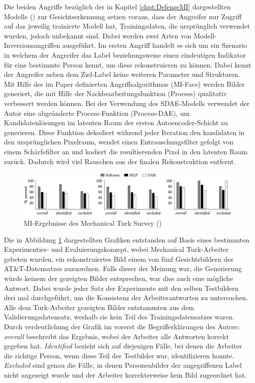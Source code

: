 Die beiden Angriffe bezüglich der in Kapitel \ref{chpt:DefenseMI} dargestellten Modelle (\cite[S. 7 ff.]{fredrikson_model_2015}) zur Gesichtserkennung setzen voraus, dass der Angreifer nur Zugriff auf das jeweilig trainierte Modell hat, Trainingsdaten, die ursprünglich verwendet wurden, jedoch unbekannt sind. Dabei werden zwei Arten von Modell-Inversionsangriffen ausgeführt. Im ersten Angriff handelt es sich um ein Szenario in welchem der Angreifer das Label beziehungsweise einen eindeutigen Indikator für eine bestimmte Person kennt, um diese rekonstruieren zu können. Dabei kennt der Angreifer neben dem Ziel-Label keine weiteren Parameter und Strukturen. Mit Hilfe des im Paper definierten Angriffsalgorithmus (MI-Face) werden Bilder generiert, die mit Hilfe der Nachbearbeitungsfunktion (Process) qualitativ verbessert werden können. Bei der Verwendung des SDAE-Modells verwendet der Autor eine abgeänderte Process-Funktion (Process-DAE), um Kandidatenlösungen im latenten Raum der ersten Autoencoder-Schicht zu generieren. Diese Funktion dekodiert während jeder Iteration den kandidaten in den ursprünglichen Pixelraum, wendet einen Entrauschungsfilter gefolgt von einem Schärfefilter an und kodiert die resultierenden Pixel in den latenten Raum zurück. Dadurch wird viel Rauschen aus der finalen Rekonstruktion entfernt. 
\begin{figure}[H]
	\centering
	\includegraphics[width=1\linewidth]{Bilder/frederikson_2015_2.png}
	\caption{MI-Ergebnisse des \glqq Mechanical Turk Survey\grqq{} (\cite[S. 10, Figure 9]{fredrikson_model_2015})}
	\label{img:frederikson_2015_evaluation2}
\end{figure}
Die in Abbildung \ref{img:frederikson_2015_evaluation2} dargestellten Grafiken entstanden auf Basis eines bestimmten Experimentier- und Evaluierungskonzept, wobei Mechanical Turk-Arbeiter gebeten wurden, ein rekonstruiertes Bild einem von fünf Gesichtsbildern des AT\&T-Datensatzes zuzuordnen. Falls dieser der Meinung war, die Generierung würde keinem der gezeigten Bilder entsprechen, war dies auch eine mögliche Antwort. Dabei wurde jeder Satz der Experimente mit den selben Testbildern drei mal durchgeführt, um die Konsistenz der Arbeiterantworten zu untersuchen. Alle dem Turk-Arbeiter gezeigten Bilder entstammten aus dem Validierungsdatensatz, weshalb sie kein Teil des Trainingsdatensatzes waren. Durch verdeutlichung der Grafik im vorerst die Begrifferklärungen des Autors: \textit{overall} beschreibt das Ergebnis, wobei der Arbeiter alle Antworten korrekt gegeben hat. \textit{Identified} bezieht sich auf diejenigen Fälle, bei denen die Arbeiter die richtige Person, wenn diese Teil der Testbilder war, identifizieren konnte. \textit{Excluded} sind genau die Fälle, in denen Personenbilder der angegriffenen Label nicht angezeigt wurde und der Arbeiter korrekterweise kein Bild zugeordnet hat.
